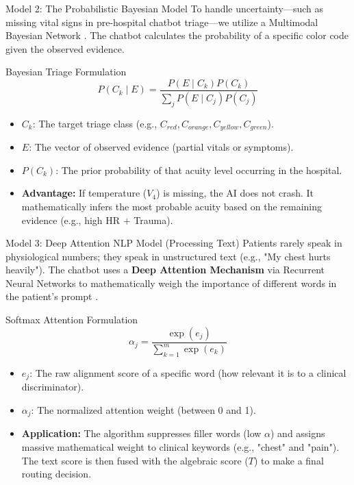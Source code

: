 \documentclass[aspectratio=169]{beamer}
\begin{document}
\begin{frame}{Model 2: The Probabilistic Bayesian Model}
	To handle uncertainty—such as missing vital signs in pre-hospital chatbot triage—we utilize a Multimodal Bayesian Network \cite{Rusiecki2025}. The chatbot calculates the probability of a specific color code given the observed evidence.
	
	\begin{block}{Bayesian Triage Formulation}
		\begin{equation}
			P(C_k \mid E) = \frac{P(E \mid C_k) P(C_k)}{\sum_{j} P(E \mid C_j) P(C_j)}
		\end{equation}
	\end{block}
	
	\begin{itemize}
		\item $C_k$: The target triage class (e.g., $C_{red}, C_{orange}, C_{yellow}, C_{green}$).
		\item $E$: The vector of observed evidence (partial vitals or symptoms).
		\item $P(C_k)$: The prior probability of that acuity level occurring in the hospital.
		\item \textbf{Advantage:} If temperature ($V_4$) is missing, the AI does not crash. It mathematically infers the most probable acuity based on the remaining evidence (e.g., high HR + Trauma).
	\end{itemize}
\end{frame}

\begin{frame}{Model 3: Deep Attention NLP Model (Processing Text)}
	Patients rarely speak in physiological numbers; they speak in unstructured text (e.g., "My chest hurts heavily"). The chatbot uses a \textbf{Deep Attention Mechanism} via Recurrent Neural Networks to mathematically weigh the importance of different words in the patient's prompt \cite{Gligorijevic2018}.
	
	\begin{block}{Softmax Attention Formulation}
		\begin{equation}
			\alpha_j = \frac{\exp(e_j)}{\sum_{k=1}^{m} \exp(e_k)}
		\end{equation}
	\end{block}
	
	\begin{itemize}
		\item $e_j$: The raw alignment score of a specific word (how relevant it is to a clinical discriminator).
		\item $\alpha_j$: The normalized attention weight (between 0 and 1).
		\item \textbf{Application:} The algorithm suppresses filler words (low $\alpha$) and assigns massive mathematical weight to clinical keywords (e.g., "chest" and "pain"). The text score is then fused with the algebraic score ($T$) to make a final routing decision.
	\end{itemize}
\end{frame}
\end{document}
